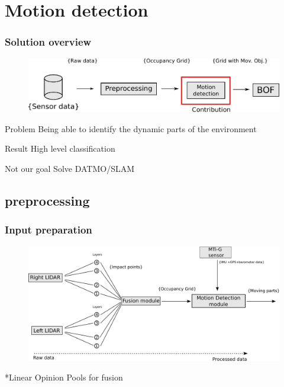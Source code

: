 \documentclass{beamer}
\begin{document}

\section{Motion detection}

	\begin{frame}
		\frametitle{Solution overview}
		\begin{figure}[h]
			\center
			\includegraphics[scale=0.6]{img/fig:motion:overview:01}
		 \end{figure}
		\begin{block}{Problem}
			 Being able to identify the dynamic parts of the environment
		\end{block}
		 
		\begin{block}{Result}
			High level classification
		\end{block}				 

		\begin{alertblock}{Not our goal}
			Solve DATMO/SLAM
		\end{alertblock}
	\end{frame}

\subsection{preprocessing}

	\begin{frame}
		\frametitle{Input preparation}
		\begin{figure}[h]
			\center
			\includegraphics[scale=0.18]{../img/fig:motion:framework}
		\end{figure}
		
		*Linear Opinion Pools \cite{ADARVE-2012-671211} for fusion
	
	\end{frame}
\end{document}
